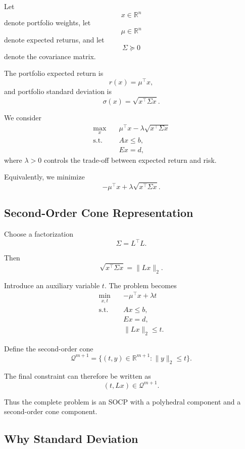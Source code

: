\documentclass[11pt,a4paper]{article}
\begin{document}
Let
\[
x\in\mathbb{R}^n
\]
denote portfolio weights, let
\[
\mu\in\mathbb{R}^n
\]
denote expected returns, and let
\[
\Sigma\succeq0
\]
denote the covariance matrix.

The portfolio expected return is
\[
r(x)=\mu^\top x,
\]
and portfolio standard deviation is
\[
\sigma(x)
=
\sqrt{x^\top\Sigma x}.
\]

We consider
\begin{equation}
\begin{aligned}
\max_x\quad&
\mu^\top x-\lambda\sqrt{x^\top\Sigma x}\\
\text{s.t.}\quad&
Ax\leq b,\\
&Ex=d,
\end{aligned}
\tag{1}
\end{equation}
where $\lambda>0$ controls the trade-off between expected return and
risk.

Equivalently, we minimize
\[
-\mu^\top x+\lambda\sqrt{x^\top\Sigma x}.
\]

\subsection{Second-Order Cone Representation}

Choose a factorization
\[
\Sigma=L^\top L.
\]

Then
\[
\sqrt{x^\top\Sigma x}
=
\|Lx\|_2.
\]

Introduce an auxiliary variable $t$. The problem becomes
\begin{equation}
\begin{aligned}
\min_{x,t}\quad&
-\mu^\top x+\lambda t\\
\text{s.t.}\quad&
Ax\leq b,\\
&Ex=d,\\
&\|Lx\|_2\leq t.
\end{aligned}
\tag{2}
\end{equation}

Define the second-order cone
\[
\mathcal Q^{m+1}
=
\{(t,y)\in\mathbb{R}^{m+1}:\|y\|_2\leq t\}.
\]

The final constraint can therefore be written as
\[
(t,Lx)\in\mathcal Q^{m+1}.
\]

Thus the complete problem is an SOCP with a polyhedral component
and a second-order cone component.

\subsection{Why Standard Deviation}
\end{document}
